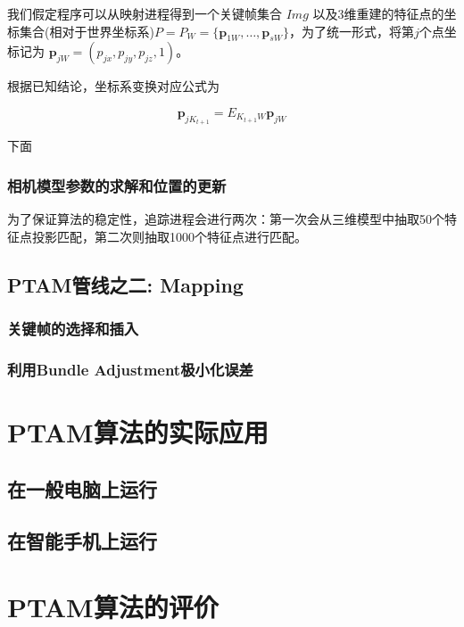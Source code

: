 \documentclass[12pt]{article}
\def \itW{\mathit{W}}
\def \bfp{\mathbf{p}}
\begin{document}
我们假定程序可以从映射进程得到一个关键帧集合 $Img$ 以及3维重建的特征点的坐标集合(相对于世界坐标系)$P=P_\itW=\{\bfp_{1\itW},\ldots,\bfp_{s\itW}\}$，为了统一形式，将第$j$个点坐标记为 $\bfp_{j\itW}= (p_{jx},p_{jy},p_{jz},1)$。

根据已知结论，坐标系变换对应公式为

\begin{equation}
\bfp_{jK_{t+1}}= E_{K_{t+1}\itW} \bfp_{j\itW}
\end{equation}

下面





\subsubsection{相机模型参数的求解和位置的更新}


为了保证算法的稳定性，追踪进程会进行两次：第一次会从三维模型中抽取50个特征点投影匹配，第二次则抽取1000个特征点进行匹配。


\subsection{PTAM管线之二: Mapping}

\subsubsection{关键帧的选择和插入}

\subsubsection{利用Bundle Adjustment极小化误差}


\section{PTAM算法的实际应用}
\subsection{在一般电脑上运行}
\subsection{在智能手机上运行}

\section{PTAM算法的评价}
\end{document}
